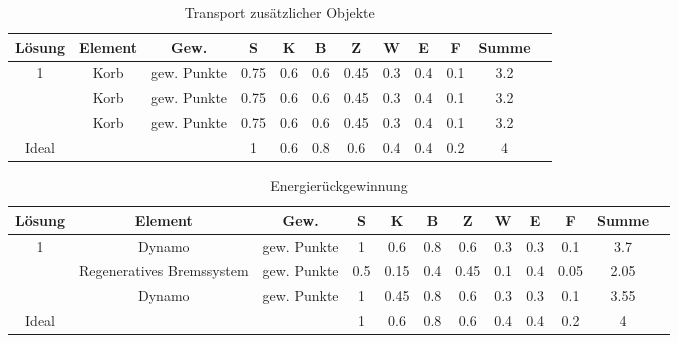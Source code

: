 \documentclass[10pt,a4paper]{article}
\begin{document}
\begin{table}[h!]
    \centering
    \begin{tabular}{cccccccccccc}
        \toprule
        \textbf{Lösung} & \textbf{Element} & \textbf{Gew.} & \textbf{S} & \textbf{K} & \textbf{B} & \textbf{Z} & \textbf{W} & \textbf{E} & \textbf{F} & \textbf{Summe} & \\
        \midrule
        1               & Korb             & gew. Punkte   & 0.75       & 0.6        & 0.6        & 0.45       & 0.3        & 0.4        & 0.1        & 3.2              \\
        \addlinespace
        2               & Korb             & gew. Punkte   & 0.75       & 0.6        & 0.6        & 0.45       & 0.3        & 0.4        & 0.1        & 3.2              \\
        \addlinespace
        3               & Korb             & gew. Punkte   & 0.75       & 0.6        & 0.6        & 0.45       & 0.3        & 0.4        & 0.1        & 3.2              \\
        \midrule
        Ideal           &                  &               & 1          & 0.6        & 0.8        & 0.6        & 0.4        & 0.4        & 0.2        & 4                \\
        \bottomrule
    \end{tabular}
    \caption{Transport zusätzlicher Objekte}
    \label{tab:transport}
\end{table}

\begin{table}[h!]
    \centering
    \begin{tabular}{cccccccccccc}
        \toprule
        \textbf{Lösung} & \textbf{Element}          & \textbf{Gew.} & \textbf{S} & \textbf{K} & \textbf{B} & \textbf{Z} & \textbf{W} & \textbf{E} & \textbf{F} & \textbf{Summe} & \\
        \midrule
        1               & Dynamo                    & gew. Punkte   & 1          & 0.6        & 0.8        & 0.6        & 0.3        & 0.3        & 0.1        & 3.7              \\
        \addlinespace
        2               & Regeneratives Bremssystem & gew. Punkte   & 0.5        & 0.15       & 0.4        & 0.45       & 0.1        & 0.4        & 0.05       & 2.05             \\
        \addlinespace
        3               & Dynamo                    & gew. Punkte   & 1          & 0.45       & 0.8        & 0.6        & 0.3        & 0.3        & 0.1        & 3.55             \\
        \midrule
        Ideal           &                           &               & 1          & 0.6        & 0.8        & 0.6        & 0.4        & 0.4        & 0.2        & 4                \\
        \bottomrule
    \end{tabular}
    \caption{Energierückgewinnung}
    \label{tab:energierueckgewinnung}
\end{table}
\end{document}
